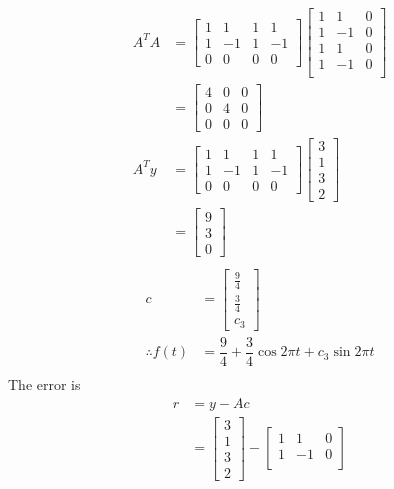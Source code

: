 \documentclass{article}
\begin{document}
\begin{enumerate}
\begin{align*}
A^TA&=\begin{bmatrix}
1&1&1&1\\1&-1&1&-1\\0&0&0&0
\end{bmatrix}\begin{bmatrix}
1&1&0\\
1&-1&0\\
1&1&0\\
1&-1&0\\
\end{bmatrix}\\
&=\begin{bmatrix}
4&0&0\\0&4&0\\0&0&0
\end{bmatrix}\\
A^Ty &=\begin{bmatrix}
1&1&1&1\\1&-1&1&-1\\0&0&0&0
\end{bmatrix} \begin{bmatrix}
3\\1\\3\\2
\end{bmatrix}\\
&=\begin{bmatrix}
9\\3\\0
\end{bmatrix}\\
\end{align*}\begin{align*}
c&=\begin{bmatrix}
\frac{9}{4}\\\frac{3}{4}\\c_3
\end{bmatrix}\\
\therefore f(t)&=\dfrac{9}{4}+\dfrac{3}{4}\cos 2 \pi t+c_3 \sin 2\pi t\\
\end{align*}
The error is \begin{align*}
r&=y-Ac\\
&=\begin{bmatrix}
3\\1\\3\\2
\end{bmatrix}-\begin{bmatrix}
1&1&0\\
1&-1&0\\

\end{bmatrix}
\end{align*}
\end{enumerate}
\end{document}
